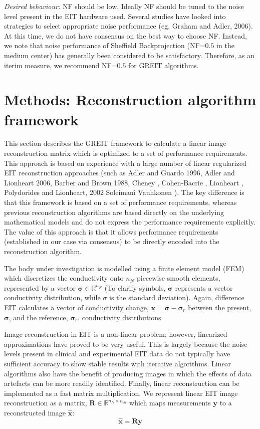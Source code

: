 \documentclass[12pt]{iopart}
\newcommand{\xB}{\mbox{$\mathbf{x}$}}
\newcommand{\xH}{\mbox{$\mathbf{\hat x}$}}
\newcommand{\yB}{\mbox{$\mathbf{y}$}}
\newcommand{\RB}{\mbox{$\mathbf{R}$}}
\newcommand{\sG}{\mbox{${\boldsymbol \sigma}$}}
\begin{document}
\begin{itemize}
\hspace{5mm}
{\em Desired behaviour:}
NF should be low. Ideally NF should be tuned to the noise
level present in the EIT hardware used.
Several studies have looked into strategies to select
appropriate noise performance (eg. Graham and Adler, 2006).
At this time, we do not have consensus on the best
way to choose NF. Instead, we note that noise performance
of Sheffield Backprojection (NF=$0.5$ in the medium center)
has generally been considered to be satisfactory.
Therefore, as an iterim measure, we recommend NF=$0.5$
for GREIT algorithms.

\end{itemize}

\section{Methods: Reconstruction algorithm framework}

This section describes the GREIT framework to calculate
a linear image reconstruction matrix which is optimized
to a set of performance requirements. This approach
is based on experience with a large number of 
linear regularized EIT reconstruction approaches
(such as
Adler and Guardo 1996,
Adler and Lionheart 2006,
Barber and Brown 1988,
Cheney ,
Cohen-Bacrie ,
Lionheart ,
Polydorides and Lionheart, 2002
Soleimani 
Vauhkonen ).
The key difference is that this framework
is based on a set of performance requirements, whereas
previous reconstruction algorithms are based directly on
the underlying mathematical models and do not express
the performance requirements explicitly.
The value of this approach is that it allows
performance requirements (established in our case
via consensus) to be directly encoded into the
reconstruction algorithm.

The body under investigation is modelled using a finite element
model (FEM) which discretizes the conductivity onto $n_N$
piecewise smooth elements, represented by a vector
$\sG\in\mathbb{R}^{n_N}$ (To clarify symbols,
$\sG$ represents a vector conductivity distribution, while
$\sigma$ is the standard deviation).
Again, difference EIT calculates a vector of
conductivity change, $\xB = \sG - \sG_r$ between the present,
$\sG$, and the reference, $\sG_r$,
conductivity distributions.

Image reconstruction in EIT is a non-linear problem; however,
linearized approximations have proved to be very useful.
This is largely because the noise levels present in clinical
and experimental EIT data do not typically have sufficient
accuracy to show stable results with iterative algorithms.
Linear algorithms also have the benefit of producing
images in which the effects
of data artefacts can be more readily identified. Finally,
linear reconstruction can be implemented as a fast matrix
multiplication. We represent linear EIT image reconstruction
as a matrix, $\RB\in\mathbb{R}^{n_N\times n_M}$ which
maps measurements $\yB$ to a reconstructed image $\xH$:
\begin{equation} 
\label{reconst_eqn}
   \xH = \RB \yB
\end{equation} 
 
\end{document}
